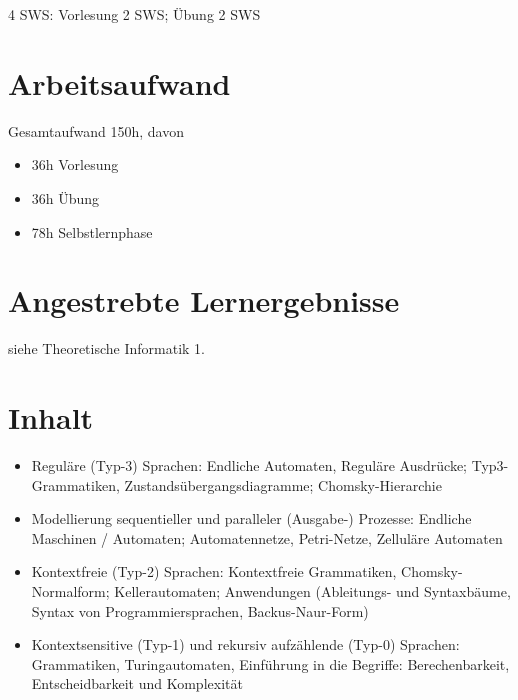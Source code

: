 4 SWS: Vorlesung 2 SWS; Übung 2 SWS

\hypertarget{arbeitsaufwandpathlabelmi-2017modulbeschreibungen-bachelorba_theoretischeinformatik2}{%
\section*{Arbeitsaufwand\label{/mi-2017/modulbeschreibungen-bachelor/BA_TheoretischeInformatik2}}\label{arbeitsaufwandpathlabelmi-2017modulbeschreibungen-bachelorba_theoretischeinformatik2}}

Gesamtaufwand 150h, davon

\begin{itemize}
\tightlist
\item
  36h Vorlesung
\item
  36h Übung
\item
  78h Selbstlernphase
\end{itemize}

\hypertarget{angestrebte-lernergebnissepathlabelmi-2017modulbeschreibungen-bachelorba_theoretischeinformatik2}{%
\section*{Angestrebte
Lernergebnisse\label{/mi-2017/modulbeschreibungen-bachelor/BA_TheoretischeInformatik2}}\label{angestrebte-lernergebnissepathlabelmi-2017modulbeschreibungen-bachelorba_theoretischeinformatik2}}

siehe Theoretische Informatik 1.

\hypertarget{inhaltpathlabelmi-2017modulbeschreibungen-bachelorba_theoretischeinformatik2}{%
\section*{Inhalt\label{/mi-2017/modulbeschreibungen-bachelor/BA_TheoretischeInformatik2}}\label{inhaltpathlabelmi-2017modulbeschreibungen-bachelorba_theoretischeinformatik2}}

\begin{itemize}
\tightlist
\item
  Reguläre (Typ-3) Sprachen: Endliche Automaten, Reguläre Ausdrücke;
  Typ3-Grammatiken, Zustandsübergangsdiagramme; Chomsky-Hierarchie
\item
  Modellierung sequentieller und paralleler (Ausgabe-) Prozesse:
  Endliche Maschinen / Automaten; Automatennetze, Petri-Netze, Zelluläre
  Automaten
\item
  Kontextfreie (Typ-2) Sprachen: Kontextfreie Grammatiken,
  Chomsky-Normalform; Kellerautomaten; Anwendungen (Ableitungs- und
  Syntaxbäume, Syntax von Programmiersprachen, Backus-Naur-Form)
\item
  Kontextsensitive (Typ-1) und rekursiv aufzählende (Typ-0) Sprachen:
  Grammatiken, Turingautomaten, Einführung in die Begriffe:
  Berechenbarkeit, Entscheidbarkeit und Komplexität
\end{itemize}

